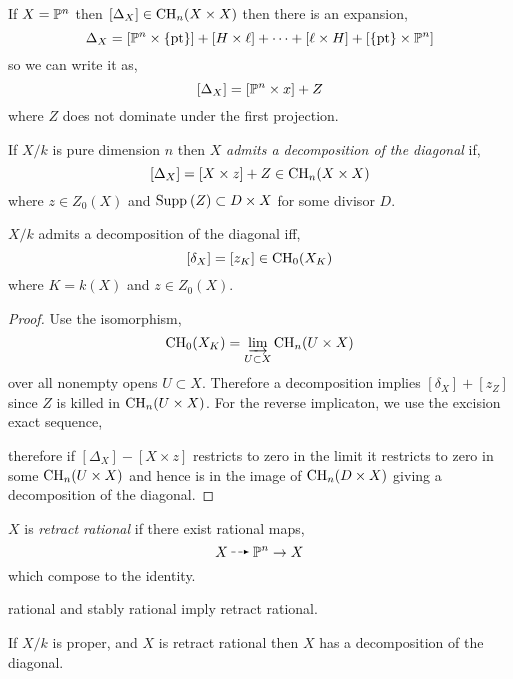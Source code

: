 \documentclass[12pt]{article}
\begin{document}
\begin{example}
If $X = \P^n$ then $[\Delta_X] \in \CH_n(X \times X)$ then there is an expansion,
\[ \Delta_X = [\P^n \times \{ \text{pt} \}] + [H \times \ell] + \cdots + [\ell \times H] + [ \{ \text{pt} \} \times \P^n ] \]
so we can write it as,
\[ [\Delta_X] = [\P^n \times x] + Z \]
where $Z$ does not dominate under the first projection. 

\begin{defn}
If $X / k$ is pure dimension $n$ then $X$ \textit{admits a decomposition of the diagonal} if,
\[ [\Delta_X] = [X \times z] + Z \in \CH_n(X \times X) \]
where $z \in Z_0(X)$ and $\Supp{}{Z} \subset D \times X$ for some divisor $D$. 
\end{defn}

\begin{lemma}
$X / k$ admits a decomposition of the diagonal iff,
\[ [\delta_X] = [z_K] \in \CH_0(X_K) \]
where $K = k(X)$ and $z \in Z_0(X)$.
\end{lemma}

\begin{proof}
Use the isomorphism,
\[ \CH_0(X_K) = \dlim_{U \subset X} \CH_{n}(U \times X) \]
over all nonempty opens $U \subset X$. Therefore a decomposition implies $[\delta_X] + [z_Z]$ since $Z$ is killed in $\CH_n(U \times X)$. For the reverse implicaton, we use the excision exact sequence,
\begin{center}
\end{center}
therefore if $[\Delta_X] - [X \times z]$ restricts to zero in the limit it restricts to zero in some $\CH_n(U \times X)$ and hence is in the image of $\CH_n(D \times X)$ giving a decomposition of the diagonal. 
\end{proof}
\end{example}

\begin{defn}
$X$ is \textit{retract rational} if there exist rational maps,
\[ X \rat \P^n \to X \]
which compose to the identity.
\end{defn}

\begin{rmk}
rational and stably rational imply retract rational.
\end{rmk}

\begin{prop}
If $X / k$ is proper, and $X$ is retract rational then $X$ has a decomposition of the diagonal. 
\end{prop}
\end{document}
